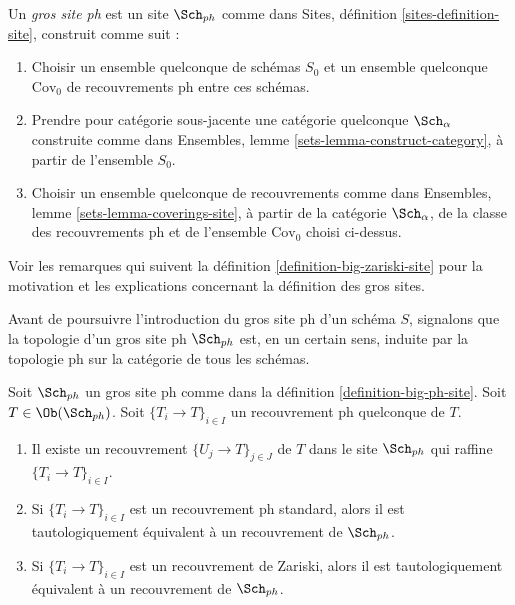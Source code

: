 \begin{definition}
\label{definition-big-ph-site}
Un {\it gros site ph} est un site $\Sch_{ph}$ comme dans
Sites, définition \ref{sites-definition-site}, construit comme suit :
\begin{enumerate}
\item Choisir un ensemble quelconque de schémas $S_0$ et un ensemble quelconque
$\text{Cov}_0$ de recouvrements ph entre ces schémas.
\item Prendre pour catégorie sous-jacente une catégorie quelconque $\Sch_\alpha$
construite comme dans Ensembles, lemme \ref{sets-lemma-construct-category},
à partir de l'ensemble $S_0$.
\item Choisir un ensemble quelconque de recouvrements comme dans
Ensembles, lemme \ref{sets-lemma-coverings-site}, à partir de la
catégorie $\Sch_\alpha$, de la classe des recouvrements ph
et de l'ensemble $\text{Cov}_0$ choisi ci-dessus.
\end{enumerate}
\end{definition}

\noindent
Voir les remarques qui suivent la définition \ref{definition-big-zariski-site}
pour la motivation et les explications concernant la définition des gros sites.

\medskip\noindent
Avant de poursuivre l'introduction du gros site ph d'un
schéma $S$, signalons que la topologie d'un gros site ph
$\Sch_{ph}$ est, en un certain sens, induite par la topologie ph
sur la catégorie de tous les schémas.

\begin{lemma}
\label{lemma-ph-induced}
Soit $\Sch_{ph}$ un gros site ph comme dans la
définition \ref{definition-big-ph-site}.
Soit $T \in \Ob(\Sch_{ph})$.
Soit $\{T_i \to T\}_{i \in I}$ un recouvrement ph quelconque de $T$.
\begin{enumerate}
\item Il existe un recouvrement $\{U_j \to T\}_{j \in J}$ de $T$ dans le site
$\Sch_{ph}$ qui raffine $\{T_i \to T\}_{i \in I}$.
\item Si $\{T_i \to T\}_{i \in I}$ est un recouvrement ph standard, alors
il est tautologiquement équivalent à un recouvrement de $\Sch_{ph}$.
\item Si $\{T_i \to T\}_{i \in I}$ est un recouvrement de Zariski, alors
il est tautologiquement équivalent à un recouvrement de $\Sch_{ph}$.
\end{enumerate}
\end{lemma}

